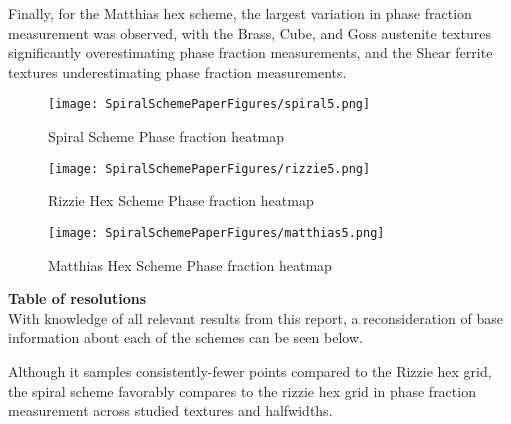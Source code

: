 \documentclass{article}
\begin{document}
Finally, for the Matthias hex scheme, the largest variation in phase fraction measurement was observed, with the Brass, Cube, and Goss austenite textures significantly overestimating phase fraction measurements, and the Shear ferrite textures underestimating phase fraction measurements.

 \begin{figure}[H]
     \centering
     \texttt{[image: SpiralSchemePaperFigures/spiral5.png]}
     \caption{Spiral Scheme Phase fraction heatmap}
 \end{figure}
 
  \begin{figure}[H]
     \centering
     \texttt{[image: SpiralSchemePaperFigures/rizzie5.png]}
     \caption{Rizzie Hex Scheme Phase fraction heatmap}
 \end{figure}
 
  \begin{figure}[H]
     \centering
     \texttt{[image: SpiralSchemePaperFigures/matthias5.png]}
     \caption{Matthias Hex Scheme Phase fraction heatmap}
 \end{figure}


\textbf{Table of resolutions}\\

With knowledge of all relevant results from this report, a reconsideration of base information about each of the schemes can be seen below. 
\begin{table}[H]
    \centering
    \caption{Table summarizing the number of sampling points for each tested scheme resolution}
\end{table}

Although it samples consistently-fewer points compared to the Rizzie hex grid, the spiral scheme favorably compares to the rizzie hex grid in phase fraction measurement across studied textures and halfwidths.
\end{document}
